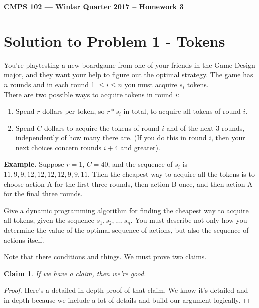 \documentclass[11pt]{article}
\newtheorem{claim}[theorem]{Claim}
\begin{document}
\begin{center}
{\bf\Large CMPS 102 --- Winter Quarter 2017 --  Homework 3}
\end{center}

\section*{Solution to Problem 1 - Tokens}

You're playtesting a new boardgame from one of your friends in the Game Design major, and they want your help to figure out the optimal strategy. The game has $n$ rounds and in each round 1 $\leq i \leq n$ you must acquire $s_i$ tokens.\\
There are two possible ways to acquire tokens in round $i$:

\begin{enumerate}[label=(\Alph*)]
\item Spend $r$ dollars per token, so $r * s_i$ in total, to acquire all tokens of round $i$.
\item Spend $C$ dollars to acquire the tokens of round $i$ and of the next 3 rounds, independently of how many there are. (If you do this in round $i$, then your next choices concern rounds $i + 4$ and greater).
\end{enumerate}

\textbf{Example.} Suppose $r = 1$, $C = 40$, and the sequence of $s_i$ is $11, 9, 9, 12, 12, 12, 12, 9, 9, 11$. Then the cheapest way to acquire all the tokens is to choose action A for the first three rounds, then action B once, and then action A for the final three rounds.


Give a dynamic programming algorithm for finding the cheapest way to acquire all tokens, given the sequence $s_1, s_2, ..., s_n$. You must describe not only how you determine the value of the optimal sequence of actions, but also the sequence of actions itself.

Note that there conditions and things. We must prove two claims.
\begin{claim} 
If we have a claim, then we're good.
\end{claim}
\begin{proof}
Here's a detailed in depth proof of that claim. We know it's detailed and in depth because we include a lot of details and build our argument logically.
\end{proof}
\end{document}
